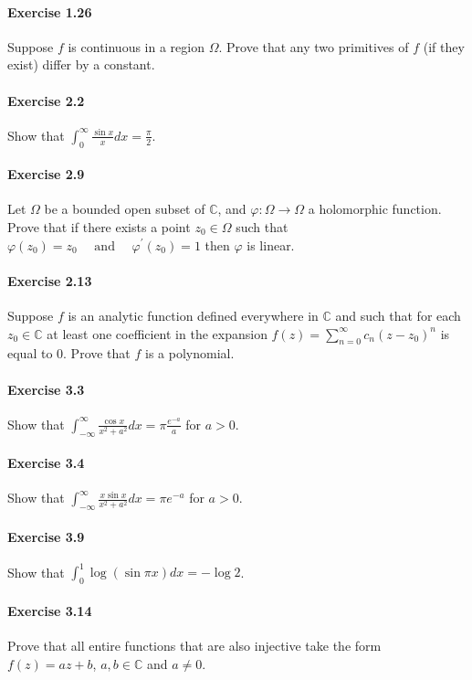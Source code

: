 \documentclass{article}
\begin{document}
\paragraph{Exercise 1.26} Suppose $f$ is continuous in a region $\Omega$. Prove that any two primitives of $f$ (if they exist) differ by a constant.


\paragraph{Exercise 2.2} Show that $\int_{0}^{\infty} \frac{\sin x}{x} d x=\frac{\pi}{2}$.


\paragraph{Exercise 2.9} Let $\Omega$ be a bounded open subset of $\mathbb{C}$, and $\varphi: \Omega \rightarrow \Omega$ a holomorphic function. Prove that if there exists a point $z_{0} \in \Omega$ such that $\varphi\left(z_{0}\right)=z_{0} \quad \text { and } \quad \varphi^{\prime}\left(z_{0}\right)=1$ then $\varphi$ is linear.


\paragraph{Exercise 2.13} Suppose $f$ is an analytic function defined everywhere in $\mathbb{C}$ and such that for each $z_0 \in \mathbb{C}$ at least one coefficient in the expansion $f(z) = \sum_{n=0}^\infty c_n(z - z_0)^n$ is equal to 0. Prove that $f$ is a polynomial.


\paragraph{Exercise 3.3} Show that $ \int_{-\infty}^{\infty} \frac{\cos x}{x^2 + a^2} dx = \pi \frac{e^{-a}}{a}$ for $a > 0$.


\paragraph{Exercise 3.4} Show that $ \int_{-\infty}^{\infty} \frac{x \sin x}{x^2 + a^2} dx = \pi e^{-a}$ for $a > 0$.


\paragraph{Exercise 3.9} Show that $\int_0^1 \log(\sin \pi x) dx = - \log 2$.


\paragraph{Exercise 3.14} Prove that all entire functions that are also injective take the form $f(z) = az + b$, $a, b \in \mathbb{C}$ and $a \neq 0$.
\end{document}

